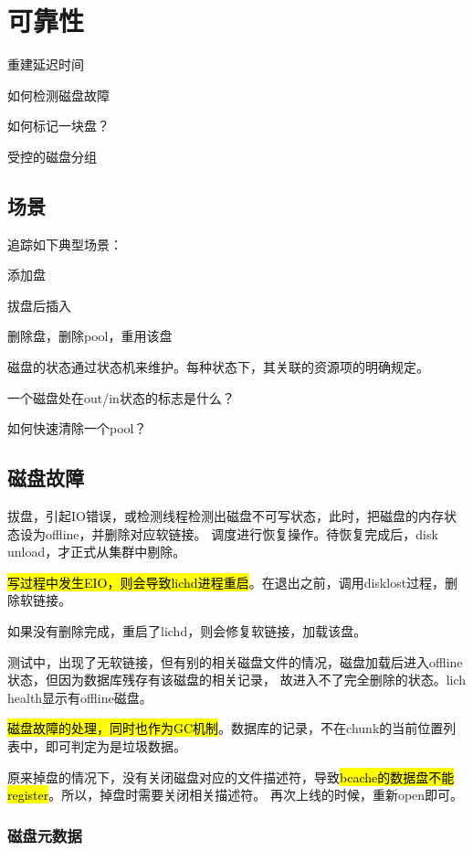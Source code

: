 \chapter{可靠性}

重建延迟时间

如何检测磁盘故障

如何标记一块盘？

受控的磁盘分组

\section{场景}

追踪如下典型场景：
\begin{enumbox}
\item 添加盘
\item 拔盘后插入
\item 删除盘，删除pool，重用该盘
\end{enumbox}

磁盘的状态通过状态机来维护。每种状态下，其关联的资源项的明确规定。

一个磁盘处在out/in状态的标志是什么？

如何快速清除一个pool？

\section{磁盘故障}

拔盘，引起IO错误，或检测线程检测出磁盘不可写状态，此时，把磁盘的内存状态设为offline，并删除对应软链接。
调度进行恢复操作。待恢复完成后，disk unload，才正式从集群中剔除。

\hl{写过程中发生EIO，则会导致lichd进程重启}。在退出之前，调用disklost过程，删除软链接。

如果没有删除完成，重启了lichd，则会修复软链接，加载该盘。

测试中，出现了无软链接，但有别的相关磁盘文件的情况，磁盘加载后进入offline状态，但因为数据库残存有该磁盘的相关记录，
故进入不了完全删除的状态。lich health显示有offline磁盘。

\hl{磁盘故障的处理，同时也作为GC机制}。数据库的记录，不在chunk的当前位置列表中，即可判定为是垃圾数据。

原来掉盘的情况下，没有关闭磁盘对应的文件描述符，导致\hl{bcache的数据盘不能register}。所以，掉盘时需要关闭相关描述符。
再次上线的时候，重新open即可。

\subsection{磁盘元数据}

